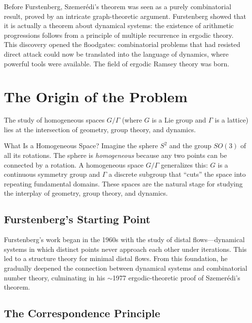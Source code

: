 Before Furstenberg, Szemer\'edi's theorem was seen as a purely combinatorial result, proved by an intricate graph-theoretic argument. Furstenberg showed that it is actually a theorem about dynamical systems: the existence of arithmetic progressions follows from a principle of multiple recurrence in ergodic theory. This discovery opened the floodgates: combinatorial problems that had resisted direct attack could now be translated into the language of dynamics, where powerful tools were available. The field of ergodic Ramsey theory was born.

\section{The Origin of the Problem}

The study of homogeneous spaces $G/\Gamma$ (where $G$ is a Lie group and $\Gamma$ is a lattice) lies at the intersection of geometry, group theory, and dynamics.

\begin{knowledgebridge}{What Is a Homogeneous Space?}
Imagine the sphere $S^2$ and the group $SO(3)$ of all its rotations. The sphere is \emph{homogeneous} because any two points can be connected by a rotation. A homogeneous space $G/\Gamma$ generalizes this: $G$ is a continuous symmetry group and $\Gamma$ a discrete subgroup that ``cuts'' the space into repeating fundamental domains. These spaces are the natural stage for studying the interplay of geometry, group theory, and dynamics.
\end{knowledgebridge}

\subsection{Furstenberg's Starting Point}

Furstenberg's work began in the 1960s with the study of distal flows---dynamical systems in which distinct points never approach each other under iterations. This led to a structure theory for minimal distal flows. From this foundation, he gradually deepened the connection between dynamical systems and combinatorial number theory, culminating in his $\sim$1977 ergodic-theoretic proof of Szemer\'edi's theorem.

\subsection{The Correspondence Principle}

